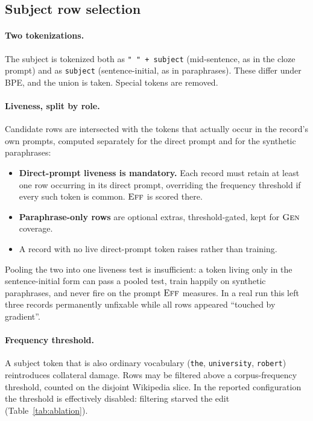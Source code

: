 \documentclass[11pt]{article}
\newcommand{\Eff}{\textsc{Eff}}
\newcommand{\Gen}{\textsc{Gen}}
\begin{document}
\subsection{Subject row selection}

\paragraph{Two tokenizations.} The subject is tokenized both as
\texttt{" "\,+\,subject} (mid-sentence, as in the cloze prompt) and as
\texttt{subject} (sentence-initial, as in paraphrases). These differ under BPE,
and the union is taken. Special tokens are removed.

\paragraph{Liveness, split by role.} Candidate rows are intersected with the
tokens that actually occur in the record's own prompts, computed separately for
the direct prompt and for the synthetic paraphrases:
\begin{itemize}
\item \textbf{Direct-prompt liveness is mandatory.} Each record must retain at
      least one row occurring in its direct prompt, overriding the frequency
      threshold if every such token is common. $\Eff$ is scored there.
\item \textbf{Paraphrase-only rows} are optional extras, threshold-gated, kept
      for $\Gen$ coverage.
\item A record with no live direct-prompt token raises rather than training.
\end{itemize}
Pooling the two into one liveness test is insufficient: a token living only in
the sentence-initial form can pass a pooled test, train happily on synthetic
paraphrases, and never fire on the prompt $\Eff$ measures. In a real run this
left three records permanently unfixable while all rows appeared ``touched by
gradient''.

\paragraph{Frequency threshold.} A subject token that is also ordinary
vocabulary (\texttt{the}, \texttt{university}, \texttt{robert}) reintroduces
collateral damage. Rows may be filtered above a corpus-frequency threshold,
counted on the disjoint Wikipedia slice. In the reported configuration the
threshold is effectively disabled: filtering starved the edit
(Table~\ref{tab:ablation}).
\end{document}
